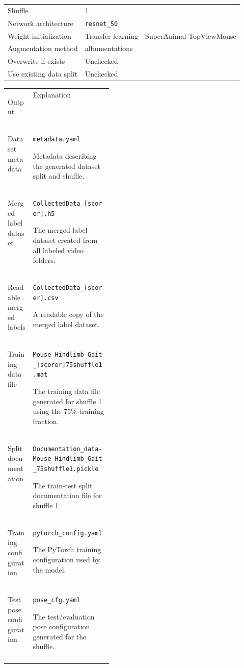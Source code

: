 \documentclass[11pt]{article}
\newif\ifalmaoutputtable
\newcommand{\boxedtoprule}{%
  \ifalmaoutputtable
    \arrayrulecolor{calloutOutputFrame}\hline\rowcolor{calloutOutputHeader}%
  \else
    \arrayrulecolor{almaBlue!62}\hline\rowcolor{almaSky!78}%
  \fi
}
\newcommand{\boxedmidrule}{%
  \ifalmaoutputtable
    \arrayrulecolor{calloutOutputFrame}\hline
  \else
    \arrayrulecolor{calloutDataFrame}\hline
  \fi
}
\newcommand{\boxedbottomrule}{%
  \ifalmaoutputtable
    \arrayrulecolor{calloutOutputFrame}\hline
  \else
    \arrayrulecolor{almaBlue!62}\hline
  \fi
}
\renewcommand{\[}{%
  \par\smallskip\noindent
  \begin{center}%
  \setlength{\fboxsep}{5pt}%
  \setlength{\fboxrule}{0.35pt}%
  \begin{lrbox}{\almaEquationBox}%
  $\displaystyle
}
\renewcommand{\]}{%
  $%
  \end{lrbox}%
  \fcolorbox{equationLine}{equationBack}{\usebox{\almaEquationBox}}%
  \end{center}%
  \smallskip\par
}
\begin{document}
\begin{tcolorbox}[software settings,title=\textbf{Create Training Dataset: Recommended Settings}]
\begin{tabularx}{\linewidth}{KV}
Shuffle & 1 \\
Network architecture & \texttt{resnet\_50} \\
Weight initialization & Transfer learning - SuperAnimal TopViewMouse \\
Augmentation method & albumentations \\
Overwrite if exists & Unchecked\\
Use existing data split & Unchecked \\
\end{tabularx}
\end{tcolorbox}

\begin{tcolorbox}[output file box,title=\textbf{Create Training Dataset Output Files}]
\begin{tabularx}{\linewidth}{
>{\bfseries\raggedright\arraybackslash}p{0.24\linewidth}|
>{\raggedright\arraybackslash}X
}
\boxedtoprule
Output & Explanation \\
\boxedmidrule
Dataset metadata & \texttt{metadata.yaml}\par
Metadata describing the generated dataset split and shuffle. \\
Merged label dataset & \texttt{CollectedData\_[scorer].h5}\par
The merged label dataset created from all labeled video folders. \\
Readable merged labels & \texttt{CollectedData\_[scorer].csv}\par
A readable copy of the merged label dataset. \\
Training data file & \texttt{Mouse\_Hindlimb\_Gait\_[scorer]75shuffle1.mat}\par
The training data file generated for shuffle 1 using the 75\% training fraction. \\
Split documentation & \texttt{Documentation\_data-Mouse\_Hindlimb\_Gait\_75shuffle1.pickle}\par
The train-test split documentation file for shuffle 1. \\
Training configuration & \texttt{pytorch\_config.yaml}\par
The PyTorch training configuration used by the model. \\
Test pose configuration & \texttt{pose\_cfg.yaml}\par
The test/evaluation pose configuration generated for the shuffle. \\
\boxedbottomrule
\end{tabularx}
\end{tcolorbox}
\end{document}
